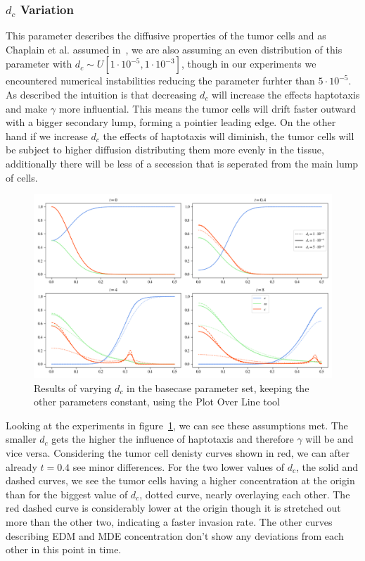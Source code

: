 \subsubsection*{$d_c$ Variation}
This parameter describes the diffusive properties of the tumor cells and as Chaplain et al. assumed in~\cite{STEPHANOU200696}, we are also assuming an even distribution of this parameter with $d_c \sim U[1\cdot 10^{-5}, 1\cdot 10^{-3}]$, though in our experiments we encountered numerical instabilities reducing the parameter furhter than $5 \cdot 10^{-5}$. \newline 
As described the intuition is that decreasing $d_c$ will increase the effects haptotaxis and make $\gamma$ more influential. This means the tumor cells will drift faster outward with a bigger secondary lump, forming a pointier leading edge. On the other hand if we increase $d_c$ the effects of haptotaxis will diminish, the tumor cells will be subject to higher diffusion distributing them more evenly in the tissue, additionally there will be less of a secession that is seperated from the main lump of cells. 
\begin{figure}[h!]
    \centering
    \includegraphics[width=\textwidth]{resources/images/dc_variation.png}
    \caption{Results of varying $d_c$ in the basecase parameter set, keeping the other parameters constant, using the Plot Over Line tool}
    \label{fig:dc_variation}
\end{figure}
Looking at the experiments in figure~\ref{fig:dc_variation}, we can see these assumptions met. The smaller $d_c$ gets the higher the influence of haptotaxis and therefore $\gamma$  will be and vice versa.\newline
Considering the tumor cell denisty curves shown in red, we can after already $t=0.4$ see minor differences. For the two lower values of $d_c$, the solid and dashed curves, we see the tumor cells having a higher concentration at the origin than for the biggest value of $d_c$, dotted curve, nearly overlaying each other. The red dashed curve is considerably lower at the origin though it is stretched  out more than the other two, indicating a faster invasion rate. The other curves describing EDM and MDE concentration don't show any deviations from each other in this point in time.\newline
